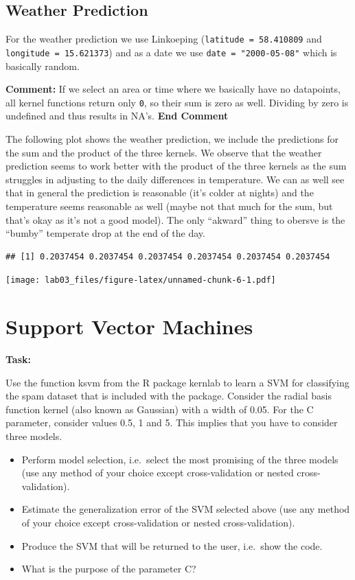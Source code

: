 \documentclass[]{article}
\providecommand{\tightlist}{%
  \setlength{\itemsep}{0pt}\setlength{\parskip}{0pt}}
\begin{document}
\subsection{Weather Prediction}\label{weather-prediction}

For the weather prediction we use Linkoeping
(\texttt{latitude\ =\ 58.410809} and \texttt{longitude\ =\ 15.621373})
and as a date we use \texttt{date\ =\ "2000-05-08"} which is basically
random.

\textbf{Comment:} If we select an area or time where we basically have
no datapoints, all kernel functions return only \texttt{0}, so their sum
is zero as well. Dividing by zero is undefined and thus results in NA's.
\textbf{End Comment}

The following plot shows the weather prediction, we include the
predictions for the sum and the product of the three kernels. We observe
that the weather prediction seems to work better with the product of the
three kernels as the sum struggles in adjusting to the daily differences
in temperature. We can as well see that in general the prediction is
reasonable (it's colder at nights) and the temperature seems reasonable
as well (maybe not that much for the sum, but that's okay as it's not a
good model). The only ``akward'' thing to obersve is the ``bumby''
temperate drop at the end of the day.

\begin{verbatim}
## [1] 0.2037454 0.2037454 0.2037454 0.2037454 0.2037454 0.2037454
\end{verbatim}

\texttt{[image: lab03\_files/figure-latex/unnamed-chunk-6-1.pdf]}

\section{Support Vector Machines}\label{support-vector-machines}

\textbf{Task:}

Use the function ksvm from the R package kernlab to learn a SVM for
classifying the spam dataset that is included with the package. Consider
the radial basis function kernel (also known as Gaussian) with a width
of 0.05. For the C parameter, consider values 0.5, 1 and 5. This implies
that you have to consider three models.

\begin{itemize}
\tightlist
\item
  Perform model selection, i.e.~select the most promising of the three
  models (use any method of your choice except cross-validation or
  nested cross-validation).
\item
  Estimate the generalization error of the SVM selected above (use any
  method of your choice except cross-validation or nested
  cross-validation).
\item
  Produce the SVM that will be returned to the user, i.e.~show the code.
\item
  What is the purpose of the parameter C?
\end{itemize}
\end{document}
